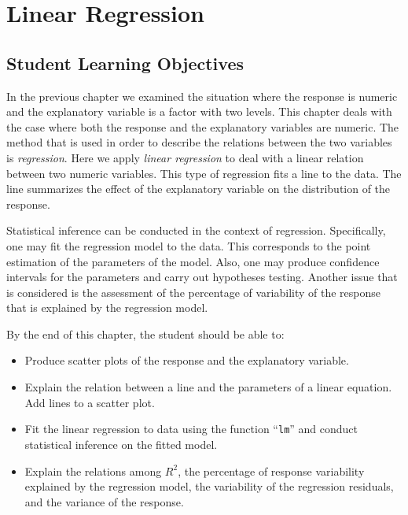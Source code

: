 \documentclass[
]{krantz}
\theoremstyle{definition}
\theoremstyle{definition}
\theoremstyle{definition}
\theoremstyle{remark}
\begin{document}
\hypertarget{ChapRegression}{%
\chapter{Linear Regression}\label{ChapRegression}}

\hypertarget{student-learning-objectives-8}{%
\section{Student Learning Objectives}\label{student-learning-objectives-8}}

In the previous chapter we examined the situation where the response is
numeric and the explanatory variable is a factor with two levels. This
chapter deals with the case where both the response and the explanatory
variables are numeric. The method that is used in order to describe the
relations between the two variables is \emph{regression}. Here we apply
\emph{linear regression} to deal with a linear relation between two numeric
variables. This type of regression fits a line to the data. The line
summarizes the effect of the explanatory variable on the distribution of
the response.

Statistical inference can be conducted in the context of regression.
Specifically, one may fit the regression model to the data. This
corresponds to the point estimation of the parameters of the model.
Also, one may produce confidence intervals for the parameters and carry
out hypotheses testing. Another issue that is considered is the
assessment of the percentage of variability of the response that is
explained by the regression model.

By the end of this chapter, the student should be able to:

\begin{itemize}
\item
  Produce scatter plots of the response and the explanatory variable.
\item
  Explain the relation between a line and the parameters of a linear
  equation. Add lines to a scatter plot.
\item
  Fit the linear regression to data using the function ``\texttt{lm}'' and
  conduct statistical inference on the fitted model.
\item
  Explain the relations among \(R^2\), the percentage of response
  variability explained by the regression model, the variability of
  the regression residuals, and the variance of the response.
\end{itemize}
\end{document}
